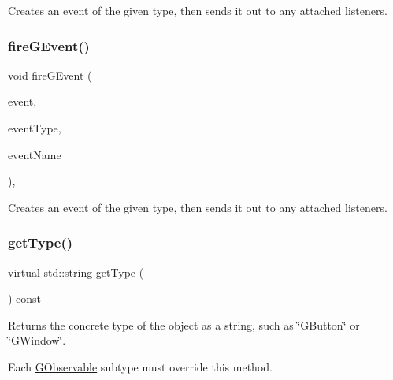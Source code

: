 Creates an event of the given type, then sends it out to any attached listeners. 

\mbox{\label{classGObservable_a2a70a7d7435ff0c3b80bb4d70da19e0d}} 
\subsubsection{\texorpdfstring{fire\+G\+Event()}{fireGEvent()}\hspace{0.1cm}{\footnotesize\ttfamily [8/8]}}
{\footnotesize\ttfamily void fire\+G\+Event (\begin{DoxyParamCaption}\item[{Q\+Window\+State\+Change\+Event $\ast$}]{event,  }\item[{Event\+Type}]{event\+Type,  }\item[{const std\+::string \&}]{event\+Name }\end{DoxyParamCaption})\hspace{0.3cm}{\ttfamily [protected]}, {\ttfamily [virtual]}}



Creates an event of the given type, then sends it out to any attached listeners. 

\mbox{\label{classGObservable_a799e073a127b428cc841086d42ea4fed}} 
\subsubsection{\texorpdfstring{get\+Type()}{getType()}}
{\footnotesize\ttfamily virtual std\+::string get\+Type (\begin{DoxyParamCaption}{ }\end{DoxyParamCaption}) const\hspace{0.3cm}{\ttfamily [pure virtual]}}



Returns the concrete type of the object as a string, such as {\ttfamily \char`\"{}\+G\+Button\char`\"{}} or {\ttfamily \char`\"{}\+G\+Window\char`\"{}}. 

Each \mbox{\hyperlink{classGObservable}{G\+Observable}} subtype must override this method. 

